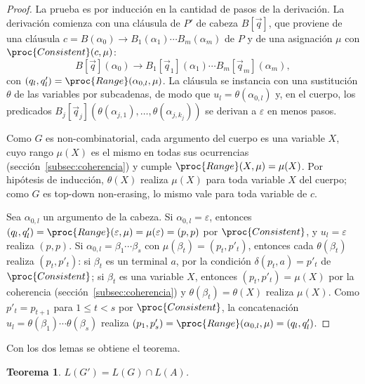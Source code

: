 \documentclass{report}
\theoremstyle{definition}
\theoremstyle{plain}
\newtheorem{teorema}{Teorema}[chapter]
\theoremstyle{remark}
\begin{document}
\begin{proof}
La prueba es por inducción en la cantidad de pasos de la derivación. La
derivación comienza con una cláusula de $P'$ de cabeza $B[\vec q]$, que
proviene de una cláusula
$c = B(\alpha_0) \to B_1(\alpha_1) \cdots B_m(\alpha_m)$ de $P$ y de una
asignación $\mu$ con $\proc{Consistent}(c, \mu)$:
\[
  B[\vec q](\alpha_0) \to B_1[\vec q_1](\alpha_1) \cdots B_m[\vec q_m](\alpha_m),
\]
con $(q_l, q'_l) = \proc{Range}(\alpha_{0,l}, \mu)$. La cláusula se instancia
con una sustitución $\theta$ de las variables por subcadenas, de modo
que $u_l = \theta(\alpha_{0,l})$ y, en el cuerpo, los predicados
$B_j[\vec q_j](\theta(\alpha_{j,1}), \ldots, \theta(\alpha_{j,k_j}))$ se
derivan a $\varepsilon$ en menos pasos.

Como $G$ es non-combinatorial, cada argumento del cuerpo es una variable
$X$, cuyo rango $\mu(X)$ es el mismo en todas sus ocurrencias
(sección~\ref{subsec:coherencia}) y cumple $\proc{Range}(X, \mu) =
\mu(X)$. Por hipótesis de inducción, $\theta(X)$ realiza $\mu(X)$ para
toda variable $X$ del cuerpo; como $G$ es top-down non-erasing, lo mismo
vale para toda variable de $c$.

Sea $\alpha_{0,l}$ un argumento de la cabeza. Si $\alpha_{0,l} =
\varepsilon$, entonces $(q_l, q'_l) = \proc{Range}(\varepsilon, \mu) =
\mu(\varepsilon) = (p, p)$ por $\proc{Consistent}$, y $u_l = \varepsilon$
realiza $(p, p)$. Si $\alpha_{0,l} = \beta_1 \cdots \beta_s$ con
$\mu(\beta_t) = (p_t, p'_t)$, entonces cada $\theta(\beta_t)$ realiza
$(p_t, p'_t)$: si $\beta_t$ es un terminal $a$, por la condición
$\delta(p_t, a) = p'_t$ de $\proc{Consistent}$; si $\beta_t$ es una
variable $X$, entonces $(p_t, p'_t) = \mu(X)$ por la coherencia
(sección~\ref{subsec:coherencia}) y $\theta(\beta_t) = \theta(X)$
realiza $\mu(X)$. Como $p'_t = p_{t+1}$ para $1 \le t < s$ por
$\proc{Consistent}$, la concatenación $u_l = \theta(\beta_1) \cdots
\theta(\beta_s)$ realiza $(p_1, p'_s) = \proc{Range}(\alpha_{0,l}, \mu) =
(q_l, q'_l)$.
\end{proof}

Con los dos lemas se obtiene el teorema.

\begin{teorema}\label{teo:correctitud}
$L(G') = L(G) \cap L(A)$.
\end{teorema}
\end{document}

